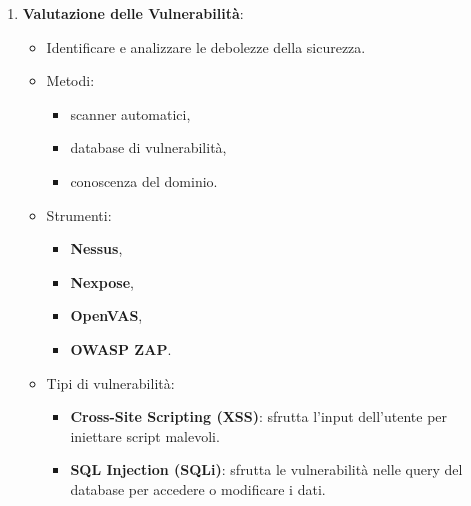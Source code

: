 \documentclass[12pt]{article}
\begin{document}
\begin{enumerate}
\begin{enumerate}
        \item \textbf{Valutazione delle Vulnerabilit\`{a}}:
        \begin{itemize}
            \item Identificare e analizzare le debolezze della sicurezza.
            \item Metodi: 
            \begin{itemize}
                \item scanner automatici,
                \item database di vulnerabilit\`{a},
                \item  conoscenza del dominio.
            \end{itemize}
            \item Strumenti: 
            \begin{itemize}
                \item \textbf{Nessus},
                \item \textbf{Nexpose},
                \item \textbf{OpenVAS},
                \item \textbf{OWASP ZAP}.
            \end{itemize}
            \item Tipi di vulnerabilit\`{a}:
            \begin{itemize}
                \item \textbf{Cross-Site Scripting (XSS)}: sfrutta l'input 
                dell'utente per iniettare script malevoli.
                \item \textbf{SQL Injection (SQLi)}: sfrutta le vulnerabilit\`{a} 
                nelle query del database per accedere o modificare i dati.
            \end{itemize}
        \end{itemize}
        

\end{enumerate}
\end{enumerate}
\end{document}
